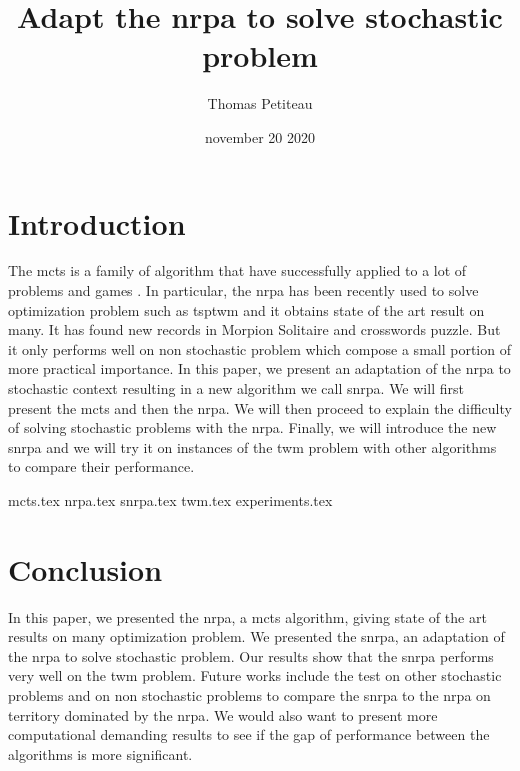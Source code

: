 \documentclass[12pt]{article}
\title{Adapt the \acrlong{nrpa} to solve stochastic problem}
\author{Thomas Petiteau}
\date{november 20 2020}
\begin{document}
    \maketitle
    \clearpage

    \tableofcontents
    \clearpage

    \section{Introduction}%
    \label{sec:introduction}
    
    The \gls{mcts} is a family of algorithm that have successfully applied to a lot of problems and games \cite{survey_mcts}.
    In particular, the \gls{nrpa} has been recently used to solve optimization problem such as \gls{tsptwm}\cite{nrpa_tsptw} and it obtains state of the art result on many.
    It has found new records in Morpion Solitaire and crosswords puzzle.
    But it only performs well on non stochastic problem which compose a small portion of more practical importance.
    In this paper, we present an adaptation of the \gls{nrpa} to stochastic context resulting in a new algorithm we call \gls{snrpa}.
    We will first present the \gls{mcts} and then the \gls{nrpa}. We will then proceed to explain the difficulty of solving stochastic problems with the \gls{nrpa}.
    Finally, we will introduce the new \gls{snrpa} and we will try it on instances of the \gls{twm} problem with other algorithms to compare their performance.
    

    {mcts.tex}
    \clearpage
    \glsresetall{}
    {nrpa.tex}
    \clearpage
    \glsresetall{}
    {snrpa.tex}
    \clearpage
    \glsresetall{}
    {twm.tex}
    \clearpage
    \glsresetall{}
    {experiments.tex}
    \clearpage

    \section{Conclusion}%
    \label{sec:conclusion}
    
    In this paper, we presented the \gls{nrpa}, a \gls{mcts} algorithm, giving state of the art results on many optimization problem.
    We presented the \gls{snrpa}, an adaptation of the \gls{nrpa} to solve stochastic problem.
    Our results show that the \gls{snrpa} performs very well on the \gls{twm} problem.
    Future works include the test on other stochastic problems and on non stochastic problems to compare the \gls{snrpa} to the \gls{nrpa} on territory dominated by the \gls{nrpa}.
    We would also want to present more computational demanding results to see if the gap of performance between the algorithms is more significant.

    \printbibliography{}
\end{document}
